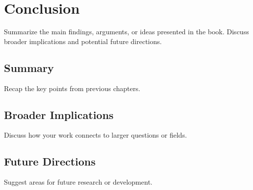 \chapter{Conclusion}

Summarize the main findings, arguments, or ideas presented in the book. Discuss broader implications and potential future directions.

\section{Summary}

Recap the key points from previous chapters.

\section{Broader Implications}

Discuss how your work connects to larger questions or fields.

\section{Future Directions}

Suggest areas for future research or development.
